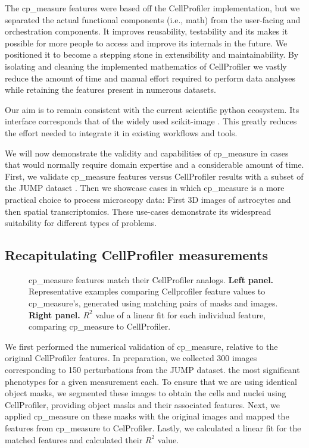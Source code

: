 \documentclass{article}
\begin{document}
The cp\_measure features were based off the CellProfiler implementation, but we separated the actual functional components (i.e., math) from the user-facing and orchestration components. It improves reusability, testability and its makes it possible for more people to access and improve its internals in the future. We positioned it to become a stepping stone in extensibility and maintainability. By isolating and cleaning the implemented mathematics of CellProfiler we vastly reduce the amount of time and manual effort required to perform data analyses while retaining the features present in numerous datasets.

Our aim is to remain consistent with the current scientific python ecosystem. Its interface corresponds that of the widely used scikit-image \citep{waltScikitimageImageProcessing2014}. This greatly reduces the effort needed to integrate it in existing workflows and tools.

We will now demonstrate the validity and capabilities of cp\_measure in cases that would normally require domain expertise and a considerable amount of time. First, we validate cp\_measure features versus CellProfiler results with a subset of the JUMP dataset \citep{chandrasekaranJUMPCellPainting2023}. Then we showcase cases in which cp\_measure is a more practical choice to process microscopy data: First 3D images of astrocytes and then spatial transcriptomics. These use-cases demonstrate its widespread suitability for different types of problems. 
\subsection{Recapitulating CellProfiler measurements}
\label{sec:org09b0cd2}

\begin{figure}[htbp]
\centering

\caption{\label{fig:cp_vs_cpmeasure}cp\_measure features match their CellProfiler analogs. \textbf{Left panel.} Representative examples comparing Cellprofiler feature values to cp\_measure's, generated using matching pairs of masks and images. \textbf{Right panel.} \(R^2\) value of a linear fit for each individual feature, comparing cp\_measure to CellProfiler.}
\end{figure}

We first performed the numerical validation of cp\_measure, relative to the original CellProfiler features. In preparation, we collected 300 images corresponding to 150 perturbations from the JUMP dataset. the most significant phenotypes for a given measurement each. To ensure that we are using identical object masks, we segmented these images to obtain the cells and nuclei using CellProfiler, providing object masks and their associated features. Next, we applied cp\_measure on these masks with the original images and mapped the features from cp\_measure to CelProfiler. Lastly, we calculated a linear fit for the matched features and calculated their \(R^2\) value.
\end{document}
